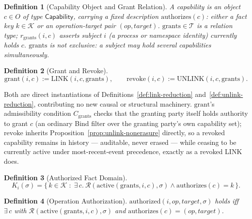 \documentclass[11pt]{article}
\newtheorem{definition}{Definition}[section]
\begin{document}
\begin{definition}[Capability Object and Grant Relation]
\label{def:capability-object}
A capability is an object $c \in O$ of type $\mathsf{Capability}$, carrying a fixed description $\mathrm{authorizes}(c)$: either a fact key $k \in \mathcal{K}$ or an operation-target pair $(\mathit{op}, \mathit{target})$. $\mathrm{grants} \in \mathcal{T}$ is a relation type; $r_{\mathrm{grants}}(i,c)$ asserts subject $i$ (a process or namespace identity) currently holds $c$. $\mathrm{grants}$ is not exclusive: a subject may hold several capabilities simultaneously.
\end{definition}

\begin{definition}[Grant and Revoke]
\label{def:grant-revoke}
\[
\mathrm{grant}(i,c) := \mathrm{LINK}(i,c,\mathrm{grants}), \qquad
\mathrm{revoke}(i,c) := \mathrm{UNLINK}(i,c,\mathrm{grants}).
\]
\end{definition}

Both are direct instantiations of Definitions~\ref{def:link-reduction} and~\ref{def:unlink-reduction}, contributing no new causal or structural machinery. $\mathrm{grant}$'s admissibility condition $C_{\mathrm{grants}}$ checks that the granting party itself holds authority to grant $c$ (an ordinary Bind filter over the granting party's own capability set); $\mathrm{revoke}$ inherits Proposition~\ref{prop:unlink-nonerasure} directly, so a revoked capability remains in history --- auditable, never erased --- while ceasing to be currently active under most-recent-event precedence, exactly as a revoked LINK does.

\begin{definition}[Authorized Fact Domain]
\label{def:authorized-domain}
\[
K_i(\sigma) = \big\{\, k \in \mathcal{K} \;:\; \exists\, c.\ \mathcal{R}(\mathrm{active}(\mathrm{grants},i,c),\sigma) \wedge \mathrm{authorizes}(c) = k \,\big\}.
\]
\end{definition}

\begin{definition}[Operation Authorization]
\label{def:op-authorization}
$\mathrm{authorized}(i, \mathit{op}, \mathit{target}, \sigma)$ holds iff $\exists\, c$ with $\mathcal{R}(\mathrm{active}(\mathrm{grants},i,c),\sigma)$ and $\mathrm{authorizes}(c) = (\mathit{op}, \mathit{target})$.
\end{definition}
\end{document}
